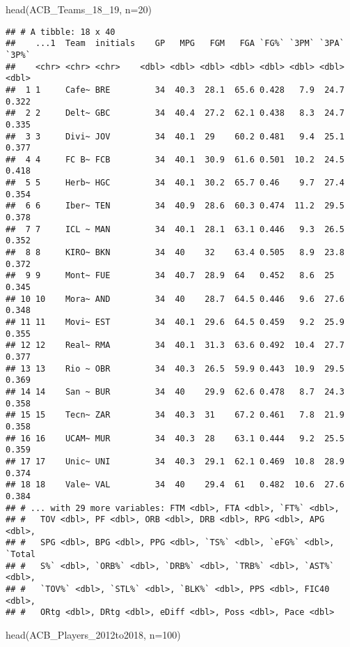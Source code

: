 \documentclass[]{article}
\newenvironment{Shaded}{\begin{snugshade}}{\end{snugshade}}
\newcommand{\KeywordTok}[1]{\textcolor[rgb]{0.94,0.87,0.69}{#1}}
\newcommand{\DataTypeTok}[1]{\textcolor[rgb]{0.87,0.87,0.75}{#1}}
\newcommand{\DecValTok}[1]{\textcolor[rgb]{0.86,0.86,0.80}{#1}}
\newcommand{\NormalTok}[1]{\textcolor[rgb]{0.80,0.80,0.80}{#1}}
\begin{document}
\begin{Shaded}
\begin{Highlighting}[]
\KeywordTok{head}\NormalTok{(ACB_Teams_18_}\DecValTok{19}\NormalTok{, }\DataTypeTok{n=}\DecValTok{20}\NormalTok{)}
\end{Highlighting}
\end{Shaded}

\begin{verbatim}
## # A tibble: 18 x 40
##    ...1  Team  initials    GP   MPG   FGM   FGA `FG%` `3PM` `3PA` `3P%`
##    <chr> <chr> <chr>    <dbl> <dbl> <dbl> <dbl> <dbl> <dbl> <dbl> <dbl>
##  1 1     Cafe~ BRE         34  40.3  28.1  65.6 0.428   7.9  24.7 0.322
##  2 2     Delt~ GBC         34  40.4  27.2  62.1 0.438   8.3  24.7 0.335
##  3 3     Divi~ JOV         34  40.1  29    60.2 0.481   9.4  25.1 0.377
##  4 4     FC B~ FCB         34  40.1  30.9  61.6 0.501  10.2  24.5 0.418
##  5 5     Herb~ HGC         34  40.1  30.2  65.7 0.46    9.7  27.4 0.354
##  6 6     Iber~ TEN         34  40.9  28.6  60.3 0.474  11.2  29.5 0.378
##  7 7     ICL ~ MAN         34  40.1  28.1  63.1 0.446   9.3  26.5 0.352
##  8 8     KIRO~ BKN         34  40    32    63.4 0.505   8.9  23.8 0.372
##  9 9     Mont~ FUE         34  40.7  28.9  64   0.452   8.6  25   0.345
## 10 10    Mora~ AND         34  40    28.7  64.5 0.446   9.6  27.6 0.348
## 11 11    Movi~ EST         34  40.1  29.6  64.5 0.459   9.2  25.9 0.355
## 12 12    Real~ RMA         34  40.1  31.3  63.6 0.492  10.4  27.7 0.377
## 13 13    Rio ~ OBR         34  40.3  26.5  59.9 0.443  10.9  29.5 0.369
## 14 14    San ~ BUR         34  40    29.9  62.6 0.478   8.7  24.3 0.358
## 15 15    Tecn~ ZAR         34  40.3  31    67.2 0.461   7.8  21.9 0.358
## 16 16    UCAM~ MUR         34  40.3  28    63.1 0.444   9.2  25.5 0.359
## 17 17    Unic~ UNI         34  40.3  29.1  62.1 0.469  10.8  28.9 0.374
## 18 18    Vale~ VAL         34  40    29.4  61   0.482  10.6  27.6 0.384
## # ... with 29 more variables: FTM <dbl>, FTA <dbl>, `FT%` <dbl>,
## #   TOV <dbl>, PF <dbl>, ORB <dbl>, DRB <dbl>, RPG <dbl>, APG <dbl>,
## #   SPG <dbl>, BPG <dbl>, PPG <dbl>, `TS%` <dbl>, `eFG%` <dbl>, `Total
## #   S%` <dbl>, `ORB%` <dbl>, `DRB%` <dbl>, `TRB%` <dbl>, `AST%` <dbl>,
## #   `TOV%` <dbl>, `STL%` <dbl>, `BLK%` <dbl>, PPS <dbl>, FIC40 <dbl>,
## #   ORtg <dbl>, DRtg <dbl>, eDiff <dbl>, Poss <dbl>, Pace <dbl>
\end{verbatim}

\begin{Shaded}
\begin{Highlighting}[]
\KeywordTok{head}\NormalTok{(ACB_Players_2012to2018, }\DataTypeTok{n=}\DecValTok{100}\NormalTok{)}
\end{Highlighting}
\end{Shaded}
\end{document}

